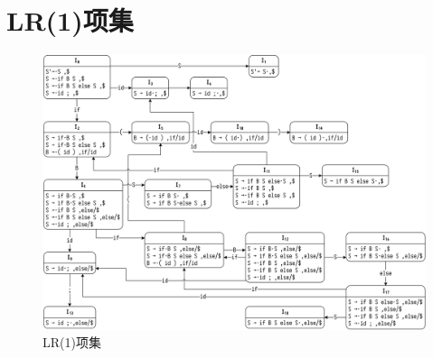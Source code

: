\section{LR(1)项集}\label{sec:LR1}
\begin{figure}[htbp]
    \centering
    \includegraphics[scale=0.6,angle=90]{../assets/LR1.png}
    \caption{LR(1)项集}\label{fig:LR1}
\end{figure}
